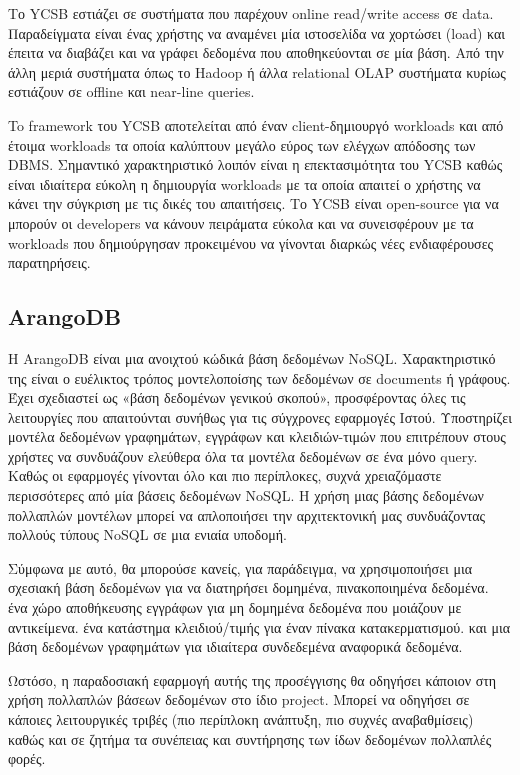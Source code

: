 \documentclass[conference]{IEEEtran}
\begin{document}
        Το YCSB εστιάζει σε συστήματα που παρέχουν online read/write access σε data. Παραδείγματα είναι ένας χρήστης να αναμένει μία ιστοσελίδα να χορτώσει (load) και έπειτα να διαβάζει και να γράφει δεδομένα που αποθηκεύονται σε μία βάση. Από την άλλη μεριά συστήματα όπως το Hadoop ή  άλλα relational OLAP συστήματα κυρίως εστιάζουν σε offline και near-line queries.
	   
        To framework του YCSB αποτελείται από έναν client-δημιουργό workloads και από έτοιμα workloads τα οποία καλύπτουν μεγάλο εύρος των ελέγχων απόδοσης των DBMS. Σημαντικό χαρακτηριστικό λοιπόν είναι η επεκτασιμότητα του YCSB καθώς είναι ιδιαίτερα εύκολη η δημιουργία workloads με τα οποία απαιτεί ο χρήστης να κάνει την σύγκριση με τις δικές του απαιτήσεις. Το YCSB είναι open-source για να μπορούν οι developers να κάνουν πειράματα εύκολα και να συνεισφέρουν με τα workloads που δημιούργησαν προκειμένου να γίνονται διαρκώς νέες ενδιαφέρουσες παρατηρήσεις.

\subsection{ArangoDB}
Η ArangoDB είναι μια ανοιχτού κώδικά βάση δεδομένων NoSQL. Χαρακτηριστικό της είναι ο ευέλικτος τρόπος μοντελοποίσης των δεδομένων σε documents ή γράφους. Έχει σχεδιαστεί ως «βάση δεδομένων γενικού σκοπού», προσφέροντας όλες τις λειτουργίες που απαιτούνται συνήθως για τις σύγχρονες εφαρμογές Ιστού. Υποστηρίζει μοντέλα δεδομένων γραφημάτων, εγγράφων και κλειδιών-τιμών που επιτρέπουν στους χρήστες να συνδυάζουν ελεύθερα όλα τα μοντέλα δεδομένων σε ένα μόνο query. Καθώς οι εφαρμογές γίνονται όλο και πιο περίπλοκες, συχνά χρειαζόμαστε περισσότερες από μία βάσεις δεδομένων NoSQL. Η χρήση μιας βάσης δεδομένων πολλαπλών μοντέλων μπορεί να απλοποιήσει την αρχιτεκτονική μας συνδυάζοντας πολλούς τύπους NoSQL σε μια ενιαία υποδομή.

Σύμφωνα με αυτό, θα μπορούσε κανείς, για παράδειγμα, να χρησιμοποιήσει μια σχεσιακή βάση δεδομένων για να διατηρήσει δομημένα, πινακοποιημένα δεδομένα. ένα χώρο αποθήκευσης εγγράφων για μη δομημένα δεδομένα που μοιάζουν με αντικείμενα. ένα κατάστημα κλειδιού/τιμής για έναν πίνακα κατακερματισμού. και μια βάση δεδομένων γραφημάτων για ιδιαίτερα συνδεδεμένα αναφορικά δεδομένα.

Ωστόσο, η παραδοσιακή εφαρμογή αυτής της προσέγγισης θα οδηγήσει κάποιον στη χρήση πολλαπλών βάσεων δεδομένων στο ίδιο project. Μπορεί να οδηγήσει σε κάποιες λειτουργικές τριβές (πιο περίπλοκη ανάπτυξη, πιο συχνές αναβαθμίσεις) καθώς και σε ζητήμα τα συνέπειας και συντήρησης των ίδων δεδομένων πολλαπλές φορές.
\end{document}
